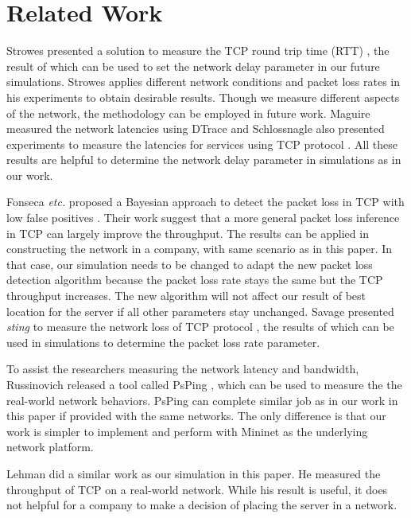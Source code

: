 \section{Related Work} \label{sec:related}

Strowes presented a solution to measure the TCP round trip time (RTT) \cite{Strowes:2013},
the result of which can be used to set the network delay parameter in our future simulations. 
Strowes applies different network conditions and packet loss rates in his experiments to 
obtain desirable results. Though we measure different aspects of the network, the methodology
can be employed in future work. Maguire measured the network latencies using DTrace \cite{Maguire:2010}
and Schlossnagle also presented experiments to measure the latencies
for services using TCP protocol \cite{Schlossnagle:2013}. 
All these results are helpful to determine the network delay parameter in simulations 
as in our work.

Fonseca {\it etc.} proposed a Bayesian approach to detect the packet loss in
TCP with low false positives \cite{FonsecaCrovella:Infocom05}. Their work suggest
that a more general packet loss inference in TCP can largely improve the throughput.
The results can be applied in constructing the network in a company, with same 
scenario as in this paper. In that case, our simulation needs to be changed
to adapt the new packet loss detection algorithm because the packet loss rate 
stays the same but the TCP throughput increases. The new algorithm will not 
affect our result of best location for the server if all other parameters 
stay unchanged. Savage presented {\it sting} to measure the network loss of TCP
protocol \cite{Savage:1999}, the results of which can be used in simulations to determine the 
packet loss rate parameter. 

To assist the researchers
measuring the network latency and bandwidth, Russinovich released a tool called PsPing
\cite{PsPing:tool}, which can be used to measure the the real-world network behaviors. 
PsPing can complete similar job as in our work in this paper if provided with the same  
networks. The only difference is that our work is simpler to implement and 
perform with Mininet as the underlying network platform. 

Lehman did a similar work  \cite{Lehman:2001} as our simulation in this paper.
He measured the throughput of TCP on a real-world network. While his result is
useful, it does not helpful for a company to make a decision of placing the 
server in a network. 